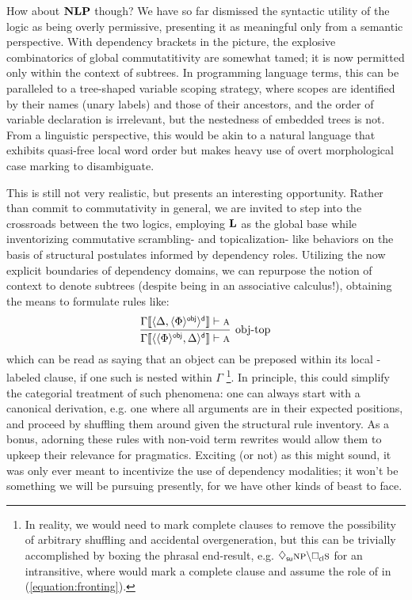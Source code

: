 How about $\textbf{NLP}$ though?
We have so far dismissed the syntactic utility of the logic as being overly permissive, presenting it as meaningful only from a semantic perspective.
With dependency brackets in the picture, the explosive combinatorics of global commutatitivity are somewhat tamed; it is now permitted only within the context of subtrees.
In programming language terms, this can be paralleled to a tree-shaped variable scoping strategy, where scopes are identified by their names (unary labels) and those of their ancestors, and the order of variable declaration is irrelevant, but the nestedness of embedded trees is not.
From a linguistic perspective, this would be akin to a natural language that exhibits quasi-free local word order but makes heavy use of overt morphological case marking to disambiguate.

This is still not very realistic, but presents an interesting opportunity.
Rather than commit to commutativity in general, we are invited to step into the crossroads between the two logics, employing $\textbf{L}$ as the global base while inventorizing commutative scrambling- and topicalization- like behaviors on the basis of structural postulates informed by dependency roles.
Utilizing the now explicit boundaries of dependency domains, we can repurpose the notion of context to denote subtrees (despite being in an associative calculus!), obtaining the means to formulate rules like:
\begin{equation}\label{equation:fronting}
	\infer[\text{obj-top}]
		{\Gamma\ctx{\dbra{\dbra{\Phi}{obj},\Delta}{d}} \vdash \prop{a}}
		{\Gamma\ctx{\dbra{\Delta, \dbra{\Phi}{obj}}{d}} \vdash \prop{a}}
\end{equation}
which can be read as saying that an object can be preposed within its local -labeled clause, if one such is nested within $\Gamma$%
	\footnote{In reality, we would need to mark complete clauses to remove the possibility of arbitrary shuffling and accidental overgeneration, but this can be trivially accomplished by boxing the phrasal end-result, e.g. $\ddia{su}\np[s]\divleft\dbox{cl}{\s[s]}$ for an intransitive, where  would mark a complete clause and assume the role of  in (\ref{equation:fronting}).}.	
In principle, this could simplify the categorial treatment of such phenomena: one can always start with a canonical derivation, e.g. one where all arguments are in their expected positions, and proceed by shuffling them around given the structural rule inventory.
As a bonus, adorning these rules with non-void term rewrites would allow them to upkeep their relevance for pragmatics.
Exciting (or not) as this might sound, it was only ever meant to incentivize the use of dependency modalities; it won't be something we will be pursuing presently, for we have other kinds of beast to face.


